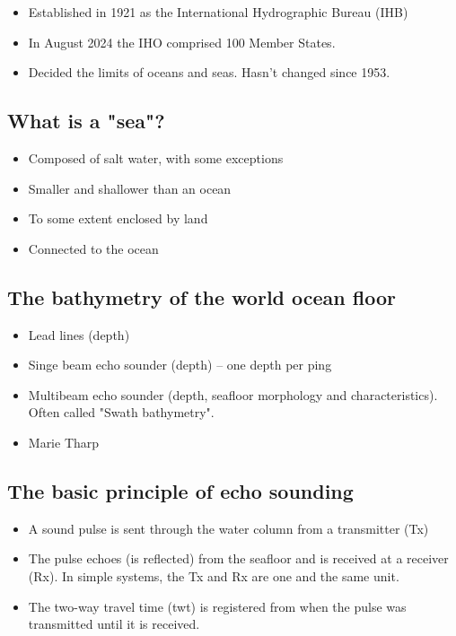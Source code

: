\begin{itemize}
    \item Established in 1921 as the International Hydrographic Bureau (IHB)
    \item In August 2024 the IHO comprised 100 Member States.
    \item Decided the limits of oceans and seas. Hasn't changed since 1953.
\end{itemize}

\subsection{What is a "sea"?}

\begin{itemize}
    \item Composed of salt water, with some exceptions
    \item Smaller and shallower than an ocean
    \item To some extent enclosed by land
    \item Connected to the ocean
\end{itemize}

\subsection{The bathymetry of the world ocean floor}

\begin{itemize}
    \item Lead lines (depth)
    \item Singe beam echo sounder (depth) -- one depth per ping
    \item Multibeam echo sounder (depth, seafloor morphology and
        characteristics). Often called "Swath bathymetry".
    \item Marie Tharp
\end{itemize}

\subsection{The basic principle of echo sounding}

\begin{itemize}
    \item A sound pulse is sent through the water column from a transmitter
        (Tx)
    \item The pulse echoes (is reflected) from the seafloor and is received at
        a receiver (Rx). In simple systems, the Tx and Rx are one and the same
        unit.
    \item The two-way travel time (twt) is registered from when the pulse was
        transmitted until it is received.
\end{itemize}

